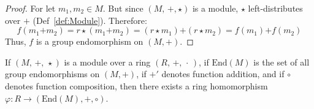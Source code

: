     \begin{proof}
        For let $m_{1},m_{2}\in{M}$. But since $(M,\,\boldsymbol{+},\star)$
        is a module, $\star$ left-distributes over $\boldsymbol{+}$
        (Def~\ref{def:Module}). Therefore:
        \begin{equation}
            f(m_{1}\boldsymbol{+}m_{2})
            =r\star(m_{1}\boldsymbol{+}m_{2})
            =(r\star{m}_{1})\boldsymbol{+}(r\star{m}_{2})
            =f(m_{1})\boldsymbol{+}f(m_{2})
        \end{equation}
        Thus, $f$ is a group endomorphism on $(M,\boldsymbol{+})$.
    \end{proof}
    \begin{theorem}
        If $(M,\,\boldsymbol{+},\,\star)$ is a module over a ring
        $(R,\,+,\,\cdot\,)$, if $\textrm{End}(M)$ is the set of all
        group endomorphisms on $(M,\boldsymbol{+})$, if $\boldsymbol{+}'$
        denotes function addition, and if $\circ$ denotes function composition,
        then there exists a ring homomorphism
        $\varphi:R\rightarrow(\textrm{End}(M),\boldsymbol{+},\circ)$.
    \end{theorem}
